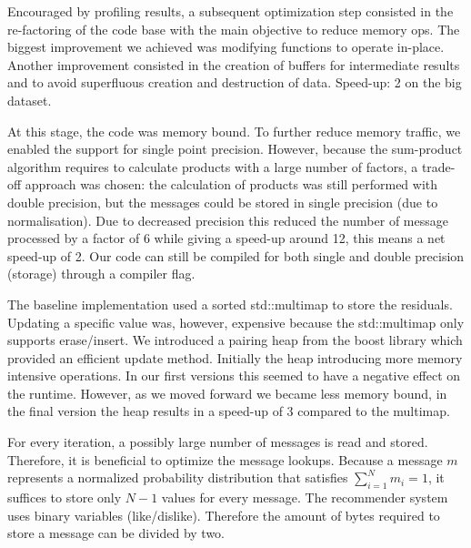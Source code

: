 
Encouraged by profiling results, a subsequent optimization step consisted in the re-factoring of the code base with the main objective to reduce memory ops. The biggest improvement we achieved was modifying functions to operate in-place. Another improvement consisted in the creation of buffers for intermediate results and to avoid superfluous creation and destruction of data. 
Speed-up: 2 on the big dataset.

At this stage, the code was memory bound. To further reduce memory traffic, we enabled the support for single point precision. However, because the sum-product algorithm requires to calculate products with a large number of factors, a trade-off approach was chosen: the calculation of products was still performed with double precision, but the messages could be stored in single precision (due to normalisation). Due to decreased precision this reduced the number of message processed by a factor of 6 while giving a speed-up around 12, this means a net speed-up of 2. Our code can still be compiled for both single and double precision (storage) through a compiler flag.

The baseline implementation used a sorted std::multimap to store the residuals. Updating a specific value was, however, expensive because the std::multimap only supports erase/insert. We introduced a pairing heap from the boost library which provided an efficient update method. Initially the heap introducing more memory intensive operations. In our first versions this seemed to have a negative effect on the runtime. However, as we moved forward we became less memory bound, in the final version the heap results in a speed-up of 3 compared to the multimap.

For every iteration, a possibly large number of messages is read and stored. Therefore, it is beneficial to optimize the message lookups. Because a message $m$ represents a normalized probability distribution that satisfies $\sum_{i=1}^N m_i = 1$, it suffices to store only $N-1$ values for every message. The recommender system uses binary variables (like/dislike). Therefore the amount of bytes required to store a message can be divided by two. 

